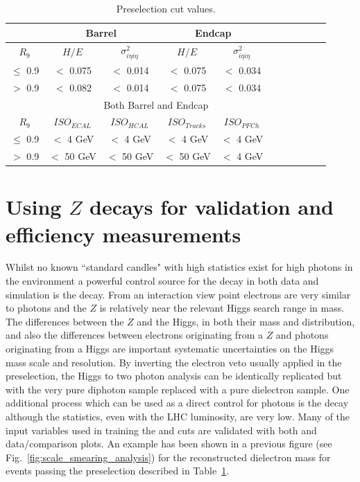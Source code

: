 \begin{table}
\noindent
  \begin{center}
  \caption{Preselection cut values.}
    \begin{tabular}{c | c c c c c c c c c c }
      \hline
                & \multicolumn{2}{c}{Barrel} & \multicolumn{2}{c}{Endcap} \\ 
      \hline
      $R_{9}$        & $H/E$ & $\sigma^{2}_{i\eta i\eta}$ & $H/E$ & $\sigma^{2}_{i\eta i\eta}$  \\ 
      $\le$ 0.9 & $<$ 0.075 & $<$ 0.014 & $<$ 0.075 & $<$ 0.034 \\
      $>$ 0.9   & $<$ 0.082 & $<$ 0.014 & $<$ 0.075 & $<$ 0.034  \\ 
      \hline    
                & \multicolumn{4}{c}{Both Barrel and Endcap}\\ 
      \hline
      $R_{9}$        & $ISO_{ECAL}$ & $ISO_{HCAL}$ &  $ISO_{Tracks}$ & $ISO_{PFCh}$ \\ 
      $\le$ 0.9 &$<$ 4 GeV & $<$ 4 GeV & $<$ 4 GeV & $<$ 4 GeV\\ 
      $>$ 0.9   &$<$ 50 GeV & $<$ 50 GeV & $<$ 50 GeV & $<$ 4 GeV\\ 
      \hline
    \end{tabular}
  \label{tab:preselection}
  \end{center}
\end{table}

\section{Using $Z$ decays for validation and efficiency measurements}
\label{sec:zee}

Whilst no known ``standard candles" with high statistics exist for high \pT photons in the \LHC environment a powerful control source for the \Hgg decay in both data and \MC simulation is the \Zee decay. From an \ECAL interaction view point electrons are very similar to photons and the $Z$ is relatively near the relevant Higgs search range in mass. The differences between the $Z$ and the Higgs, in both their mass and \pT distribution, and also the differences between electrons originating from a $Z$ and photons originating from a Higgs are important systematic uncertainties on the Higgs mass scale and resolution. By inverting the electron veto usually applied in the preselection, the Higgs to two photon analysis can be identically replicated but with the very pure diphoton sample replaced with a pure dielectron sample. One additional process which can be used as a direct control for photons is the \Zmumugamma decay although the statistics, even with the LHC luminosity, are very low. Many of the input variables used in training the \BDTs and cuts are validated with both \Zee and \Zmumugamma data/\MC comparison plots. An example has been shown in a previous figure (see Fig.~\ref{fig:scale_smearing_analysis}) for the reconstructed dielectron mass for events passing the preselection described in Table~\ref{tab:preselection}.

